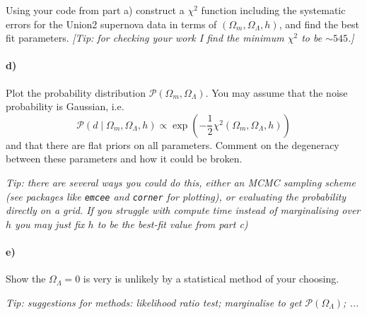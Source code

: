 \documentclass[12pt]{article}
\begin{document}
Using your code from part a) construct a $\chi^2$ function including the systematic errors for the Union2 supernova data in terms of $(\Omega_m, \Omega_\Lambda, h)$, and find the best fit parameters. \emph{[Tip: for checking your work I find the minimum $\chi^2$ to be $\sim 545$.]}

\paragraph{d)}
Plot the probability distribution $\mathcal{P}(\Omega_m, \Omega_\Lambda)$. You may assume that the noise probability is Gaussian, i.e.
\begin{equation}
\mathcal{P}(d \mid \Omega_m, \Omega_\Lambda, h) \propto \exp{\left(-\frac{1}{2}\chi^2(\Omega_m, \Omega_\Lambda, h)\right)}
\end{equation}
and that there are flat priors on all parameters. Comment on the degeneracy between these parameters and how it could be broken.

\emph{Tip: there are several ways you could do this, either an MCMC sampling scheme (see packages like \texttt{emcee} and \texttt{corner} for plotting), or evaluating the probability directly on a grid. If you struggle with compute time instead of marginalising over $h$ you may just fix $h$ to be the best-fit value from part c)}

\paragraph{e)}
Show the $\Omega_\Lambda = 0$ is very is unlikely by a statistical method of your choosing.

\emph{Tip: suggestions for methods: likelihood ratio test; marginalise to get $\mathcal{P}(\Omega_\Lambda)$; ...}
\end{document}
